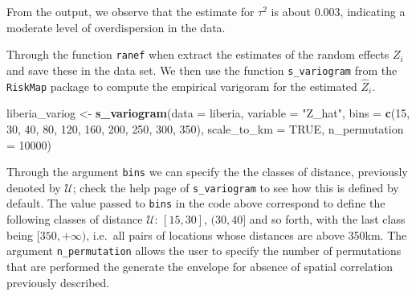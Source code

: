 \documentclass[
  letterpaper,
]{krantz}
\newenvironment{Shaded}{\begin{snugshade}}{\end{snugshade}}
\newcommand{\AttributeTok}[1]{\textcolor[rgb]{0.13,0.29,0.53}{#1}}
\newcommand{\ConstantTok}[1]{\textcolor[rgb]{0.56,0.35,0.01}{#1}}
\newcommand{\DecValTok}[1]{\textcolor[rgb]{0.00,0.00,0.81}{#1}}
\newcommand{\FunctionTok}[1]{\textcolor[rgb]{0.13,0.29,0.53}{\textbf{#1}}}
\newcommand{\NormalTok}[1]{#1}
\newcommand{\OtherTok}[1]{\textcolor[rgb]{0.56,0.35,0.01}{#1}}
\newcommand{\SpecialCharTok}[1]{\textcolor[rgb]{0.81,0.36,0.00}{\textbf{#1}}}
\newcommand{\StringTok}[1]{\textcolor[rgb]{0.31,0.60,0.02}{#1}}
\begin{document}
From the output, we observe that the estimate for \(\tau^2\) is about
0.003, indicating a moderate level of overdispersion in the data.

\begin{Shaded}
\end{Shaded}

Through the function \texttt{ranef} when extract the estimates of the
random effects \(Z_i\) and save these in the data set. We then use the
function \texttt{s\_variogram} from the \texttt{RiskMap} package to
compute the empirical varigoram for the estimated \(\hat{Z}_i\).

\begin{Shaded}
\begin{Highlighting}[]
\NormalTok{liberia\_variog }\OtherTok{\textless{}{-}} \FunctionTok{s\_variogram}\NormalTok{(}\AttributeTok{data =}\NormalTok{ liberia,}
                              \AttributeTok{variable =} \StringTok{"Z\_hat"}\NormalTok{,}
                              \AttributeTok{bins =} \FunctionTok{c}\NormalTok{(}\DecValTok{15}\NormalTok{, }\DecValTok{30}\NormalTok{, }\DecValTok{40}\NormalTok{, }\DecValTok{80}\NormalTok{, }\DecValTok{120}\NormalTok{,}
                                       \DecValTok{160}\NormalTok{, }\DecValTok{200}\NormalTok{, }\DecValTok{250}\NormalTok{, }\DecValTok{300}\NormalTok{, }\DecValTok{350}\NormalTok{),}
                              \AttributeTok{scale\_to\_km =} \ConstantTok{TRUE}\NormalTok{,}
                              \AttributeTok{n\_permutation =} \DecValTok{10000}\NormalTok{)}
\end{Highlighting}
\end{Shaded}

Through the argument \texttt{bins} we can specify the the classes of
distance, previously denoted by \(\mathcal{U}\); check the help page of
\texttt{s\_variogram} to see how this is defined by default. The value
passed to \texttt{bins} in the code above correspond to define the
following classes of distance \(\mathcal{U}\): \([15, 30]\),
\((30, 40]\) and so forth, with the last class being \([350, +\infty)\),
i.e.~all pairs of locations whose distances are above 350km. The
argument \texttt{n\_permutation} allows the user to specify the number
of permutations that are performed the generate the envelope for absence
of spatial correlation previously described.
\end{document}
